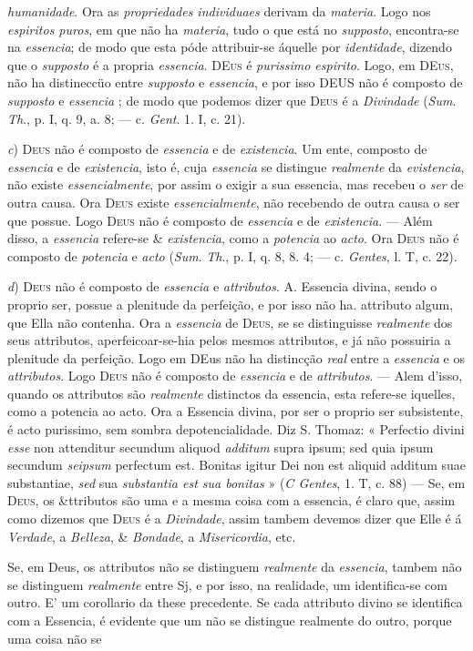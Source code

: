 \emph{humanidade}. Ora as \emph{propriedades individuaes} derivam da \emph{materia}. Logo nos \emph{espiritos puros}, em que não ha \emph{materia}, tudo o que está no \emph{supposto}, encontra-se na \emph{essencia}; de modo que esta póde attribuir-se áquelle por \emph{identidade}, dizendo que o \emph{supposto} é a propria \emph{essencia}. \textsc{DEus} é \emph{purissimo espirito}. Logo, em \textsc{DEus}, não ha distineccüo entre \emph{supposto} e \emph{essencia}, e por isso \textsc{DEUS} não é composto de \emph{supposto} e \emph{essencia} ; de modo que podemos dizer que \textsc{Deus} é a \emph{Divindade} (\emph{Sum}. \emph{Th}., p. I, q. 9, a. 8; --- c. \emph{Gent}. 1. I, c. 21).\par \emph{c}) \textsc{Deus} não é composto de \emph{essencia} e de \emph{existencia}. Um ente, composto de \emph{essencia} e de \emph{existencia}, isto é, cuja \emph{essencia} se distingue \emph{realmente} da \emph{evistencia}, não existe \emph{essencialmente}, por assim o exigir a sua essencia, mas recebeu o \emph{ser} de outra causa. Ora \textsc{Deus} existe \emph{essencialmente}, não recebendo de outra causa o ser que possue. Logo \textsc{Deus} não é composto de \emph{essencia} e de \emph{existencia}. --- Além disso, a \emph{essencia} refere-se \& \emph{existencia}, como a \emph{potencia} ao \emph{acto}. Ora \textsc{Deus} não é composto de \emph{potencia} e \emph{acto} (\emph{Sum}. \emph{Th}., p. I, q. 8, 8. 4; --- c. \emph{Gentes}, l. T, c. 22).\par \emph{d}) \textsc{Deus} não é composto de \emph{essencia} e \emph{attributos}. A. Essencia divina, sendo o proprio ser, possue a plenitude da perfeição, e por isso não ha. attributo algum, que Ella não contenha. Ora a \emph{essencia} de \textsc{Deus}, se se distinguisse \emph{realmente} dos seus attributos, aperfeicoar-se-hia pelos mesmos attributos, e já não possuiria a plenitude da perfeição. Logo em DEus não ha distincção \emph{real} entre a \emph{essencia} e os \emph{attributos}. Logo \textsc{Deus} não é composto de \emph{essencia} e de \emph{attributos}. --- Alem d'isso, quando os attributos são \emph{realmente} distinctos da essencia, esta refere-se iquelles, como a potencia ao acto. Ora a Essencia divina, por ser o proprio ser subsistente, é acto purissimo, sem sombra depotencialidade. Diz S. Thomaz: « Perfectio divini \emph{esse} non attenditur secundum aliquod \emph{additum} supra ipsum; sed quia ipsum secundum \emph{seipsum} perfectum est. Bonitas igitur Dei non est aliquid additum suae substantiae, \emph{sed} sua \emph{substantia est sua bonitas} » (\emph{C Gentes}, 1. T, c. 88) --- Se, em \textsc{Deus}, os \&ttributos são uma e a mesma coisa com a essencia, é claro que, assim como dizemos que \textsc{Deus} é a \emph{Divindade}, assim tambem devemos dizer que Elle é á \emph{Verdade}, a \emph{Belleza}, \& \emph{Bondade}, a \emph{Misericordia}, etc.\par Se, em Deus, os attributos não se distinguem \emph{realmente} da \emph{essencia}, tambem não se distinguem \emph{realmente} entre Sj, e por isso, na realidade, um identifica-se com outro. E' um corollario da these precedente. Se cada attributo divino se identifica com a Essencia, é evidente que um não se distingue realmente do outro, porque uma coisa não se 